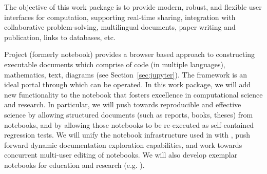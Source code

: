 \begin{draft}
\end{draft}

\begin{workpackage}[id=UI,wphases=0-48,swsites,
  title=User Interfaces,
  lead=SR,
  PSRM=26,  %
  UVRM=2,   %
  JURM=12,  %
  USHRM=6, %
  LLRM=12, %
  SARM=18, %
  UKRM=2, %
  UBRM=28,  %
  USORM=16, %
  SRRM=28,
  USRM=4, %
  swsites]    %

\begin{wpobjectives}
  The objective of this work package is to provide modern, robust,
  and flexible user interfaces for computation, supporting real-time
  sharing, integration with collaborative problem-solving,
  multilingual documents, paper writing and publication, links to
  databases, etc.
\end{wpobjectives}

\begin{wpdescription}
  Project \Jupyter (formerly \IPython notebook) provides a browser
  based approach to constructing executable documents which comprise
  of code (in multiple languages), mathematics, text, diagrams (see
  Section~\ref{sec:jupyter}). The
  framework is an ideal portal through which \VREs can be operated. In
  this work package, we will add new functionality to the \Jupyter
  notebook that fosters excellence in computational science and
  research. In particular, we will push towards reproducible and
  effective science by allowing structured documents (such as reports,
  books, theses) from notebooks, and by allowing those notebooks to be
  re-executed as self-contained regression tests. We will unify the
  notebook infrastructure used in \Sage with \Jupyter, push forward
  dynamic documentation exploration capabilities, and work towards
  concurrent multi-user editing of notebooks. We will also develop
  exemplar \Jupyter notebooks for education and research
  (e.g. ).


\end{wpdescription}
\end{workpackage}
